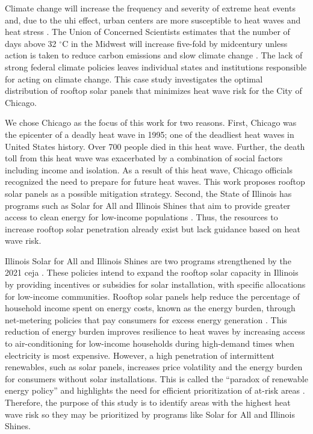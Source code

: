 Climate change will increase the frequency and severity of extreme heat events and,
due to the \ac{uhi} effect, urban centers are more susceptible to heat waves and
heat stress \cite{zhao_strong_2014,dahl_killer_2019}. The Union of Concerned
Scientists estimates that the number of days above 32 $^\circ$C in the Midwest
will increase five-fold by midcentury unless action is taken to reduce carbon
emissions and slow climate change  \cite{dahl_killer_2019}. The lack of strong
federal climate policies leaves individual states and institutions responsible
for acting on climate change. This case study investigates the optimal distribution
of rooftop solar panels that minimizes heat wave risk for the City of Chicago.

We chose Chicago as the focus of this work for two reasons. First, Chicago was the
epicenter of a deadly heat wave in 1995; one of the deadliest heat waves in United
States history. Over 700 people died in this heat wave\cite{klinenberg_heat_2003}.
Further, the death toll from this heat wave was exacerbated by a combination of
social factors including income and isolation. As a result of this heat wave,
Chicago officials recognized the need to prepare for future heat waves. This
work proposes rooftop solar panels as a possible mitigation strategy.
Second, the State of Illinois has programs such as Solar for All and Illinois
Shines that aim to provide greater access to clean energy for low-income populations
\cite{illinois_solar_for_all_environmental_2022}. Thus, the resources to increase
rooftop solar penetration already exist but lack guidance based on heat wave risk.

Illinois Solar for All and Illinois Shines are two programs strengthened by the
2021 \ac{ceja} \cite{harmon_climate_2021}. These policies intend to expand the
rooftop solar capacity in Illinois by providing incentives or subsidies for solar
installation, with specific allocations for low-income communities. Rooftop solar
panels help reduce the percentage of household income spent on energy costs,
known as the energy burden, through net-metering policies that pay consumers for
excess energy generation \cite{brown_high_2020}. This reduction of energy burden
improves resilience to heat waves by increasing access to air-conditioning for
low-income households during high-demand times when electricity is most expensive.
However, a high penetration of intermittent renewables, such as solar panels,
increases price volatility and the energy burden for consumers without solar
installations. This is called the ``paradox of renewable energy policy'' and
highlights the need for efficient prioritization of at-risk areas \cite{blazquez_renewable_2018}.
Therefore, the purpose of this study is to identify areas with the highest heat
wave risk so they may be prioritized by programs like Solar for All and Illinois
Shines.

